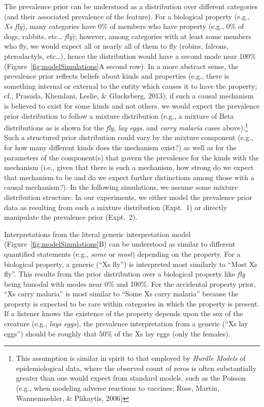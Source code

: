 \documentclass[floatsintext,doc]{apa6}
\let\rmarkdownfootnote\footnote%
\def\footnote{\protect\rmarkdownfootnote}
\begin{document}
The prevalence prior can be understood as a distribution over different categories (and their associated prevalence of the feature).
For a biological property (e.g., \emph{Xs fly}), many categories have 0\% of members who have property (e.g., 0\% of dogs, rabbits, etc\ldots{} \emph{fly}); however, among categories with at least some members who fly, we would expect all or nearly all of them to fly (robins, falcons, pterodactyls, etc\ldots{}), hence the distribution would have a second mode near 100\% (Figure~\ref{fig:modelSimulations}A second row).
In a more abstract sense, the prevalence prior reflects beliefs about kinds and properties (e.g., there is something internal or external to the entity which causes it to have the property; cf., Prasada, Khemlani, Leslie, \& Glucksberg, 2013); if such a causal mechanism is believed to exist for some kinds and not others, we would expect the prevalence prior distribution to follow a mixture distribution (e.g., a mixture of Beta distributions as is shown for the \emph{fly}, \emph{lay eggs}, and \emph{carry malaria} cases above).\footnote{This assumption is similar in spirit to that employed by \emph{Hurdle Models} of epidemiological data, where the observed count of zeros is often substantially greater than one would expect from standard models, such as the Poisson (e.g., when modeling adverse reactions to vaccines; Rose, Martin, Wannemuehler, \& Plikaytis, 2006)}
Such a structured prior distribution could vary by the mixture component (e.g., for how many different kinds does the mechanism exist?) as well as for the parameters of the component(s) that govern the prevalence for the kinds with the mechanism (i.e., given that there is such a mechanism, how strong do we expect that mechanism to be and do we expect further distinctions among those with a causal mechanism?).
In the following simulations, we assume some mixture distribution structure.
In our experiments, we either model the prevalence prior data as resulting from such a mixture distribution (Expt.~1) or directly manipulate the prevalence prior (Expt.~2). 

Interpretations from the literal generic interpretation model (Figure~\ref{fig:modelSimulations}B) can be understood as similar to different quantified statements (e.g., \emph{some} or \emph{most}) depending on the property. 
For a biological property, a generic (\enquote{Xs fly}) is interpreted most similarly to \enquote{Most Xs fly}.
This results from the prior distribution over a biological property like \emph{fly} being bimodal with modes near 0\% and 100\%.
For the accidental property prior, \enquote{Xs carry malaria} is most similar to \enquote{Some Xs carry malaria} because the property is expected to be rare within categories in which the property is present.
If a listener knows the existence of the property depends upon the sex of the creature (e.g., \emph{lays eggs}), the prevalence interpretation from a generic (\enquote{Xs lay eggs}) should be roughly that 50\% of the Xs lay eggs (only the females).
\end{document}
